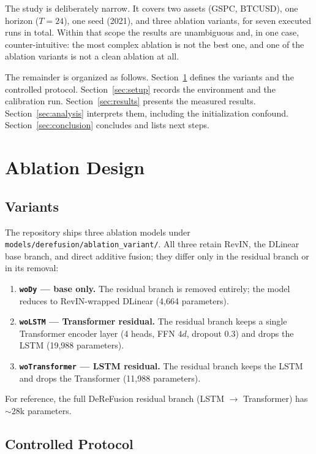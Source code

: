 \documentclass[conference]{IEEEtran}
\begin{document}
The study is deliberately narrow. It covers two assets (GSPC, BTCUSD), one
horizon ($T{=}24$), one seed (2021), and three ablation variants, for seven
executed runs in total. Within that scope the results are unambiguous and,
in one case, counter-intuitive: the most complex ablation is not the best
one, and one of the ablation variants is not a clean ablation at all.

The remainder is organized as follows. Section~\ref{sec:design} defines the
variants and the controlled protocol. Section~\ref{sec:setup} records the
environment and the calibration run. Section~\ref{sec:results} presents the
measured results. Section~\ref{sec:analysis} interprets them, including the
initialization confound. Section~\ref{sec:conclusion} concludes and lists
next steps.

\section{Ablation Design}
\label{sec:design}

\subsection{Variants}

The repository ships three ablation models under
\texttt{models/derefusion/ablation\_variant/}. All three retain RevIN, the
DLinear base branch, and direct additive fusion; they differ only in the
residual branch or in its removal:

\begin{enumerate}
  \item \textbf{\texttt{woDy} --- base only.} The residual branch is removed
        entirely; the model reduces to RevIN-wrapped DLinear
        (4{,}664 parameters).
  \item \textbf{\texttt{woLSTM} --- Transformer residual.} The residual
        branch keeps a single Transformer encoder layer (4 heads, FFN
        $4d$, dropout 0.3) and drops the LSTM (19{,}988 parameters).
  \item \textbf{\texttt{woTransformer} --- LSTM residual.} The residual
        branch keeps the LSTM and drops the Transformer
        (11{,}988 parameters).
\end{enumerate}

For reference, the full DeReFusion residual branch (LSTM $\rightarrow$
Transformer) has ${\sim}28$k parameters.

\subsection{Controlled Protocol}
\end{document}
